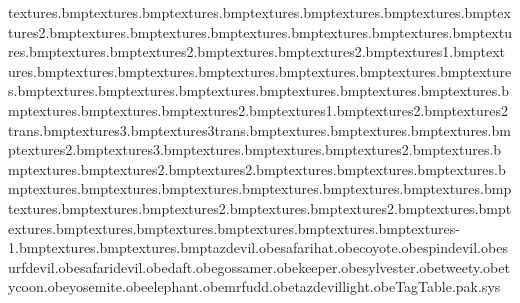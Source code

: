 textures\black.bmp textures\bluebucket.bmp textures\bluetrousers.bmp textures\body.bmp textures\bodyeyebrow.bmp textures\bodytoes.bmp textures\bodytoes2.bmp textures\brownboots.bmp textures\brownhair.bmp textures\brownsoles.bmp textures\daffybill.bmp textures\daffyinmouth.bmp textures\ears.bmp textures\earslined.bmp textures\earslined2.bmp textures\eyetex.bmp textures\eyetex2.bmp textures\flesh1.bmp textures\fuddboots.bmp textures\fuddgunbarrel.bmp textures\fuddhatred.bmp textures\fuddmouth.bmp textures\fuddskin.bmp textures\fuddsuit.bmp textures\fuddtongue.bmp textures\limbtrans.bmp textures\mouth.bmp textures\mouthhole.bmp textures\muzzle.bmp textures\muzzlestubble.bmp textures\nose.bmp textures\noseshine.bmp textures\fuddcap.bmp textures\safhat2.bmp textures\spin1.bmp textures\spin2.bmp textures\spin2trans.bmp textures\spin3.bmp textures\spin3trans.bmp textures\teeth.bmp textures\tongue.bmp textures\tongueline.bmp textures\tongueline2.bmp textures\tongueline3.bmp textures\white.bmp textures\whiteshirt.bmp textures\daffynostril2.bmp textures\eyetextweety.bmp textures\gossfinger.bmp textures\gossshoe2.bmp textures\keeperbutton2.bmp textures\keepercollar.bmp textures\keepereye.bmp textures\keeperfingers.bmp textures\keeperhat.bmp textures\keepertache.bmp textures\sylvesterfuredge.bmp textures\tsamankles.bmp textures\tsambutton.bmp textures\tsamcollar.bmp textures\tsamteeth.bmp textures\tsamtie.bmp textures\tweetybrow2.bmp textures\wileeeyeball.bmp textures\wileenosebridge2.bmp textures\elephanteye.bmp textures\elephanttoes.bmp textures\elephantwrinkles.bmp textures\fuddmike.bmp textures\fuddshoe.bmp textures\fuddstripes.bmp textures\fuddwhistlebit-1.bmp textures\keepernettrans.bmp textures\ramps.bmp tazdevil.obe safarihat.obe coyote.obe spindevil.obe surfdevil.obe safaridevil.obe daft.obe gossamer.obe keeper.obe sylvester.obe tweety.obe tycoon.obe yosemite.obe elephant.obe mrfudd.obe tazdevillight.obe TagTable.pak.sys 